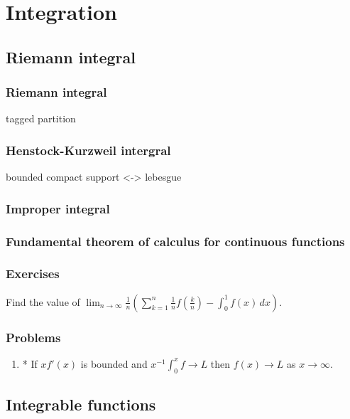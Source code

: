 \documentclass{../note}
\begin{document}
\part{Integration}

\chapter{Riemann integral}
\section{Riemann integral}
tagged partition
\section{Henstock-Kurzweil intergral}
bounded compact support <-> lebesgue
\section{Improper integral}
\section{Fundamental theorem of calculus for continuous functions}

\section*{Exercises}
\begin{prb}
Find the value of $\lim_{n\to\infty}\frac1n\left(\sum_{k=1}^n\frac1nf\left(\frac kn\right)-\int_0^1f(x)\,dx\right)$.
\end{prb}

\section*{Problems}
\begin{enumerate}
\item* If $xf'(x)$ is bounded and $x^{-1}\int_0^xf\to L$ then $f(x)\to L$ as $x\to\infty$.
\end{enumerate}


\chapter{Integrable functions}
\section{}
\end{document}
